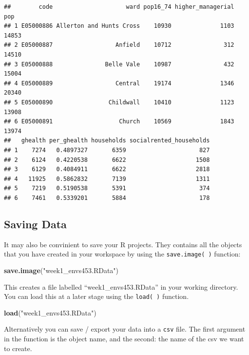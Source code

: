 \documentclass[]{book}
\newenvironment{Shaded}{\begin{snugshade}}{\end{snugshade}}
\newcommand{\KeywordTok}[1]{\textcolor[rgb]{0.13,0.29,0.53}{\textbf{#1}}}
\newcommand{\NormalTok}[1]{#1}
\newcommand{\StringTok}[1]{\textcolor[rgb]{0.31,0.60,0.02}{#1}}
\begin{document}
\begin{verbatim}
##        code                     ward pop16_74 higher_managerial   pop
## 1 E05000886 Allerton and Hunts Cross    10930              1103 14853
## 2 E05000887                  Anfield    10712               312 14510
## 3 E05000888               Belle Vale    10987               432 15004
## 4 E05000889                  Central    19174              1346 20340
## 5 E05000890                Childwall    10410              1123 13908
## 6 E05000891                   Church    10569              1843 13974
##   ghealth per_ghealth households socialrented_households
## 1    7274   0.4897327       6359                     827
## 2    6124   0.4220538       6622                    1508
## 3    6129   0.4084911       6622                    2818
## 4   11925   0.5862832       7139                    1311
## 5    7219   0.5190538       5391                     374
## 6    7461   0.5339201       5884                     178
\end{verbatim}

\hypertarget{saving-data}{%
\subsection{Saving Data}\label{saving-data}}

It may also be convinient to save your R projects. They contains all the objects that you have created in your workspace by using the \texttt{save.image(\ )} function:

\begin{Shaded}
\begin{Highlighting}[]
\KeywordTok{save.image}\NormalTok{(}\StringTok{"week1_envs453.RData"}\NormalTok{)}
\end{Highlighting}
\end{Shaded}

This creates a file labelled ``week1\_envs453.RData'' in your working directory. You can load this at a later stage using the \texttt{load(\ )} function.

\begin{Shaded}
\begin{Highlighting}[]
\KeywordTok{load}\NormalTok{(}\StringTok{"week1_envs453.RData"}\NormalTok{)}
\end{Highlighting}
\end{Shaded}

Alternatively you can save / export your data into a \texttt{csv} file. The first argument in the function is the object name, and the second: the name of the csv we want to create.
\end{document}
